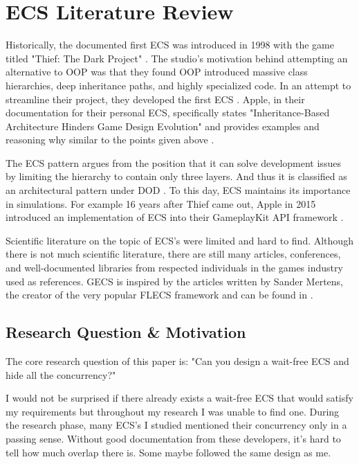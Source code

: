\section{ECS Literature Review}
\label{chap:1}

Historically, the documented first ECS was introduced in 1998 with the game titled "Thief: The Dark Project" \cite{RomeoPHD}. The studio's motivation behind attempting an alternative to OOP was that they found OOP introduced massive class hierarchies, deep inheritance paths, and highly specialized code. In an attempt to streamline their project, they developed the first ECS \cite{Haerkoenen2019}. Apple, in their documentation for their personal ECS, specifically states "Inheritance-Based Architecture Hinders Game Design Evolution" and provides examples and reasoning why similar to the points given above \cite{AppleECSBad}.

The ECS pattern argues from the position that it can solve development issues by limiting the hierarchy to contain only three layers. And thus it is classified as an architectural pattern under DOD \cite{RomeoPHD}. To this day, ECS maintains its importance in simulations. For example 16 years after Thief came out, Apple in 2015 introduced an implementation of ECS into their GameplayKit API framework \cite{AppleECS}.

Scientific literature on the topic of ECS's were limited and hard to find. Although there is not much scientific literature, there are still many articles, conferences, and well-documented libraries from respected individuals in the games industry used as references. GECS is inspired by the articles written by Sander Mertens, the creator of the very popular FLECS framework and can be found in \cite{SanderMertensECS}. 

\subsection{Research Question \& Motivation}
The core research question of this paper is: "Can you design a wait-free ECS and hide all the concurrency?"

I would not be surprised if there already exists a wait-free ECS that would satisfy my requirements but throughout my research I was unable to find one. During the research phase, many ECS's I studied mentioned their concurrency only in a passing sense. Without good documentation from these developers, it's hard to tell how much overlap there is. Some maybe followed the same design as me.

